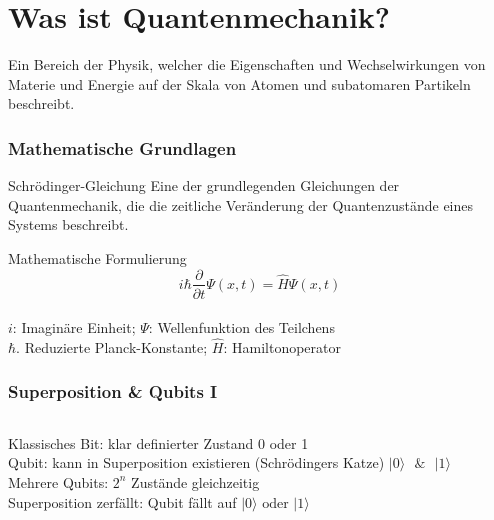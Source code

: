 \section{Was ist Quantenmechanik?}
\begin{frame}
	\begin{Definition}
		Ein Bereich der Physik, welcher die Eigenschaften und Wechselwirkungen von Materie und Energie auf der Skala von Atomen und subatomaren Partikeln beschreibt.
	\end{Definition}
\end{frame}

\begin{frame}
	\frametitle{Mathematische Grundlagen}
	\begin{block}{Schrödinger-Gleichung}
		Eine der grundlegenden Gleichungen der Quantenmechanik, die die zeitliche Veränderung der Quantenzustände eines Systems beschreibt.
	\end{block}
	\pause
	\begin{alertblock}{Mathematische Formulierung}
		\[i \hbar \frac{\partial}{\partial t} \Psi(x,t) = \hat{H} \Psi(x,t)\]\\
		$i$: Imagin{\"a}re Einheit; $\Psi$: Wellenfunktion des Teilchens\\
		$\hbar$. Reduzierte Planck-Konstante; $\hat{H}$: Hamiltonoperator
	\end{alertblock}
\end{frame}

\begin{frame}
	\frametitle{Superposition \& Qubits I}
	\begin{columns}
		\begin{column}{0.48\linewidth}
			Klassisches Bit: klar definierter Zustand \textrightarrow { }0 oder 1\\
			\vspace{0.5em}
			Qubit: kann in Superposition existieren (Schr{\"o}dingers Katze)
			$|0\rangle{\text{ }}\&{\text{ }}|1\rangle$\\
			\vspace{0.5em}
			Mehrere Qubits: $2^n$ Zust{\"a}nde gleichzeitig\\
			\vspace{0.5em}
			Superposition zerf{\"a}llt: Qubit f{\"a}llt auf $|0\rangle\text{ oder }|1\rangle$
		\end{column}
		\begin{column}{0.48\linewidth}
		\end{column}
	\end{columns}
\end{frame}

